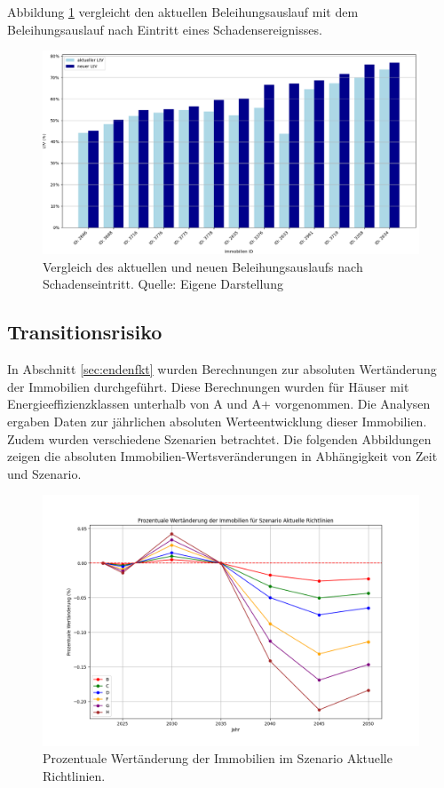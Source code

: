 Abbildung \ref{fig:schadenLtV} vergleicht den aktuellen Beleihungsauslauf mit dem Beleihungsauslauf nach Eintritt eines Schadensereignisses.

\begin{figure}[htbp]
    \centering
    \includegraphics[width=\textwidth]{figures/compareltv.png}
    \caption{Vergleich des aktuellen und neuen Beleihungsauslaufs nach Schadenseintritt. Quelle: Eigene Darstellung}
    \label{fig:schadenLtV}
\end{figure}
\FloatBarrier



\subsection{Transitionsrisiko}
In Abschnitt \ref{sec:endenfkt} wurden Berechnungen zur absoluten Wertänderung der Immobilien durchgeführt. Diese Berechnungen wurden für Häuser mit Energieeffizienzklassen unterhalb von A und A+ vorgenommen. Die Analysen ergaben Daten zur jährlichen absoluten Werteentwicklung dieser Immobilien. Zudem wurden verschiedene Szenarien betrachtet. Die folgenden Abbildungen zeigen die absoluten Immobilien-Wertsveränderungen in Abhängigkeit von Zeit und Szenario.
\begin{figure}[H]
    \centering
    \includegraphics[width=\linewidth]{figures/Aktuelle Richtlinien_percentage_change_plot.png}
    \caption{Prozentuale Wertänderung der Immobilien im Szenario Aktuelle Richtlinien.}
    \label{fig:aktuelle_richtlinien}
\end{figure}

